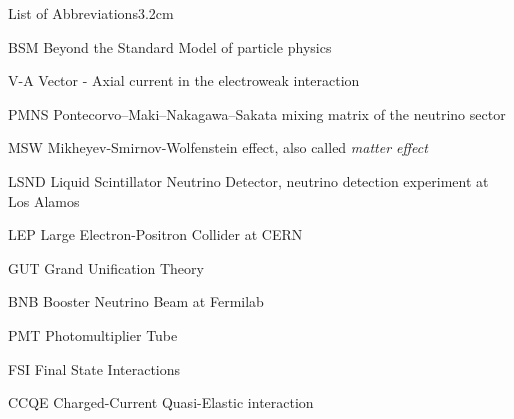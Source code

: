 \begin{mclistof}{List of Abbreviations}{3.2cm}

\item[BSM] Beyond the Standard Model of particle physics
\item[V-A] Vector - Axial current in the electroweak interaction
\item[PMNS] Pontecorvo–Maki–Nakagawa–Sakata mixing matrix of the neutrino sector
\item[MSW] Mikheyev-Smirnov-Wolfenstein effect, also called \emph{matter effect}
\item[LSND] Liquid Scintillator Neutrino Detector, neutrino detection experiment at Los Alamos
\item[LEP] Large Electron-Positron Collider at CERN
\item[GUT] Grand Unification Theory
\item[BNB] Booster Neutrino Beam at Fermilab
\item[PMT] Photomultiplier Tube
\item[FSI] Final State Interactions 
\item[CCQE] Charged-Current Quasi-Elastic interaction

\end{mclistof} 

